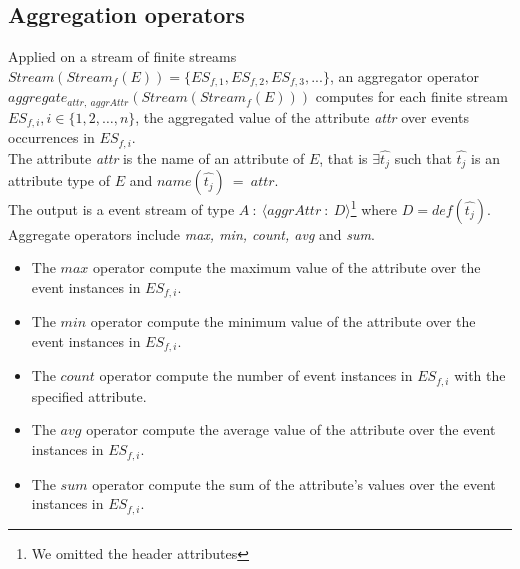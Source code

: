 \subsection{Aggregation operators}
Applied on a stream of finite streams $Stream(Stream_f(E))= \{ES_{f,1}, ES_{f,2}, ES_{f,3}, ...\}$, an aggregator operator $aggregate_{attr,\ aggrAttr}(Stream(Stream_f(E)))$ computes for each finite stream $ES_{f,i}, i \in \{1, 2, …, n\}$, the aggregated value of the attribute \textit{attr} over events occurrences in $ES_{f,i}$.
\\The attribute \textit{attr} is the name of an attribute of $E$, that is $\exists \hat{t_j}$ such that $\hat{t_j}$ is an attribute type of $E$ and $name(\hat{t_j})\ =\ attr$.  
\\The output is a event stream of type $A\ :\ \langle aggrAttr\ :\ D \rangle$\footnote{We omitted the header attributes} 
where $D=def(\hat{t_j})$. 
\\ Aggregate operators include \textit{max, min, count, avg} and \textit{sum}. 
\begin{itemize}
 \item The $max$ operator compute the maximum value of the attribute over the event instances in $ES_{f,i}$.
 \item The $min$ operator compute the minimum value of the attribute over the event instances in $ES_{f,i}$.
 \item The $count$ operator compute the number of event instances in $ES_{f,i}$ with the specified attribute.
 \item The $avg$ operator compute the average value of the attribute over the event instances in $ES_{f,i}$.
 \item The $sum$ operator compute the sum of the attribute's values over the event instances in $ES_{f,i}$.
\end{itemize}

